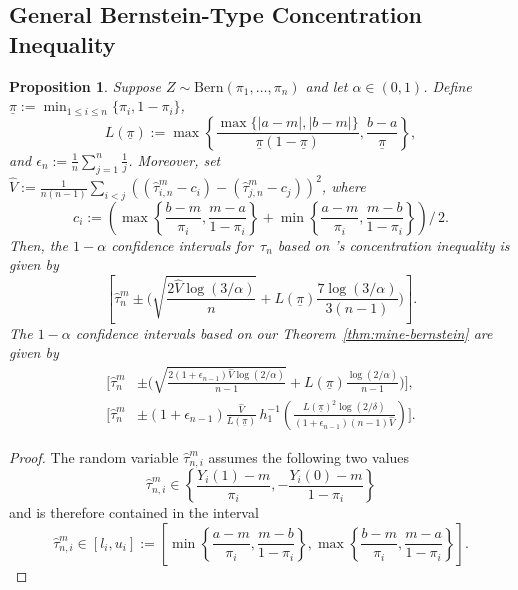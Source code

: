 \documentclass[aos]{imsart2}
\theoremstyle{plain}
\newtheorem{proposition}[theorem]{Proposition}
\theoremstyle{definition}
\newcommand{\vh}{\hat{V}}
\newcommand{\tauh}{\hat{\tau}}
\newcommand{\bern}{\mathrm{Bern}}
\newcommand{\piu}{\underline{\pi}}
\begin{document}
\begin{appendix}
\subsection{General Bernstein-Type Concentration Inequality}\label{app:bernoulli-general-bernstein}
\begin{proposition}
    Suppose $Z\sim \bern(\pi_1,\ldots,\pi_n)$ and let $\alpha \in (0,1)$. Define $\piu := \min_{1 \leq i \leq n} \{\pi_i, 1-\pi_i\}$,
    \begin{equation*}
        L(\piu) := \max\left\{\frac{\max\{\lvert a-m\rvert, \lvert b -m \rvert\}}{\piu(1-\piu)}, \frac{b-a}{\piu}\right\},
    \end{equation*}
    and $\epsilon_n := \frac{1}{n} \sum_{j=1}^{n} \frac{1}{j}$. Moreover, set $\vh := \frac{1}{n(n-1)}\sum_{i<j} ((\tauh^m_{i,n}-c_i)-(\tauh^m_{j,n}-c_j))^2$, where
    \begin{equation*}
        c_i := \left(\max\left\{\frac{b-m}{\pi_i},\frac{m-a}{1-\pi_i}\right\}+\min\left\{\frac{a-m}{\pi_i},\frac{m-b}{1-\pi_i}\right\}\right)\Big/\,2.
    \end{equation*}
    Then, the $1-\alpha$ confidence intervals for~$\tau_n$ based on \citet{maurer_empirical_2009}'s concentration inequality is given by
    \begin{equation*}
        \left[\tauh^m_n \pm \Bigg(\sqrt{\frac{2\vh\log(3/\alpha)}{n}} + L(\piu)\frac{7\log(3/\alpha)}{3(n-1)}\Bigg)\right].
    \end{equation*}
    The $1-\alpha$ confidence intervals based on our Theorem~\ref{thm:mine-bernstein} are given by
    \begin{align*}
        \Bigg[\tauh^m_n &\pm \Bigg(\sqrt{\frac{2(1+\epsilon_{n-1})\vh\log(2/\alpha)}{n-1}} + L(\piu)\frac{\log(2/\alpha)}{n-1}\Bigg)\Bigg],\\
        \Bigg[\tauh^m_n &\pm (1+\epsilon_{n-1})\frac{\vh}{L(\piu)}\, h_1^{-1}\!\left(\frac{L(\piu)^2\log(2/\delta)}{(1+\epsilon_{n-1})(n-1)\vh}\right)\Bigg].
    \end{align*}
\end{proposition}
\begin{proof}
    The random variable $\tauh^m_{n,i}$ assumes the following two values
    \begin{equation*}
        \tauh^m_{n,i} \in \left\{\frac{Y_i(1)-m}{\pi_i}, - \frac{Y_i(0)-m}{1-\pi_i}\right\}
    \end{equation*}
    and is therefore contained in the interval
    \begin{equation*}
        \tauh^m_{n,i} \in [l_i, u_i] := \left[\min\left\{\frac{a-m}{\pi_i}, \frac{m-b}{1-\pi_i}\right\}, \max\left\{\frac{b-m}{\pi_i}, \frac{m-a}{1-\pi_i}\right\}\right].

\end{equation*}
\end{proof}
\end{appendix}
\end{document}
